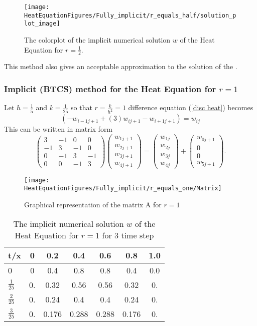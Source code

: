 \begin{example}
\begin{figure}[H]
  \caption{The colorplot of the implicit numerical solution $w$ of the Heat Equation for $r=\frac{1}{2}$.}
  \centering
    \texttt{[image: HeatEquationFigures/Fully\_implicit/r\_equals\_half/solution\_plot\_image]}
\end{figure}


This method also gives an acceptable approximation to the solution of the .
\end{example}
\begin{example}
\subsubsection{Implicit (BTCS) method for the Heat Equation for $r=1$}
Let $h=\frac{1}{5}$ and $k=\frac{1}{25}$ so that $r=\frac{k}{h^2}=1$
difference equation (\ref{disc heat}) becomes
\[
(-w_{i-1j+1}+(3)w_{ij+1}-w_{i+1j+1})=w_{ij}
\]
This can be written in matrix form 
\[
\left(\begin{array}{cccc}
3&-1&0&0\\
-1&3&-1&0\\
0&-1&3&-1\\
0&0&-1&3
\end{array}\right)
\left(\begin{array}{c}
w_{1j+1}\\
w_{2j+1}\\
w_{3j+1}\\
w_{4j+1}
\end{array}\right)
=
\left(\begin{array}{c}
w_{1j}\\
w_{2j}\\
w_{3j}\\
w_{4j}
\end{array}\right)+\left(\begin{array}{c}
w_{0j+1}\\
0\\
0\\
w_{5j+1}
\end{array}\right).
\]
\begin{figure}[H]
  \caption{Graphical representation of the matrix A for $r=1$ }
  \centering
    \texttt{[image: HeatEquationFigures/Fully\_implicit/r\_equals\_one/Matrix]}
\end{figure}


\begin{center}
\begin{table}[H]
 \caption{The implicit numerical solution $w$ of the Heat Equation for $r=1$ for 3 time step}
 \centering
\begin{tabular}{l|cccccc}
t/x&0&0.2&0.4&0.6&0.8&1.0\\ \hline
0&0&0.4&0.8&0.8&0.4&0.0\\
$\frac{1}{25}$&0.  &  0.32  &0.56&  0.56 & 0.32  &0.\\
$\frac{2}{25}$&0. &   0.24 & 0.4  & 0.4  & 0.24 & 0.\\
$\frac{3}{25}$&0. &    0.176&  0.288 & 0.288 & 0.176 & 0. 
\end{tabular}
\end{table}
\end{center}


\end{example}
